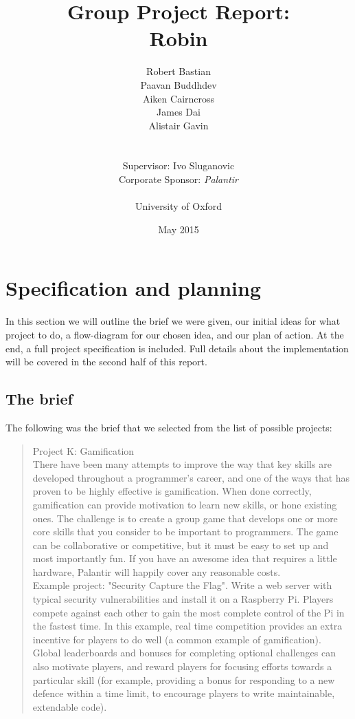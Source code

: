 \documentclass{report}
\title{Group Project Report:\\Robin}
\author{Robert Bastian\\Paavan Buddhdev\\Aiken Cairncross\\James Dai\\Alistair Gavin\\\\\\Supervisor: Ivo Sluganovic\\Corporate Sponsor: \emph{Palantir}\\\\University of Oxford}
\date{May 2015}
\begin{document}
\maketitle
\tableofcontents

\chapter{Specification and planning}
In this section we will outline the brief we were given, our initial ideas for what project to do, a flow-diagram for our chosen idea, and our plan of action. At the end, a full project specification is included. Full details about the implementation will be covered in the second half of this report.

\section{The brief}
The following was the brief that we selected from the list of possible projects:

\begin{quote}Project K: Gamification\\There have been many attempts to improve the way that key skills are developed throughout a programmer's career, and one of the ways that has proven to be highly effective is gamification. When done correctly, gamification can provide motivation to learn new skills, or hone existing ones. The challenge is to create a group game that develops one or more core skills that you consider to be important to programmers. The game can be collaborative or competitive, but it must be easy to set up and most importantly fun. If you have an awesome idea that requires a little hardware, Palantir will happily cover any reasonable costs.\\Example project: "Security Capture the Flag". Write a web server with typical security vulnerabilities and install it on a Raspberry Pi. Players compete against each other to gain the most complete control of the Pi in the fastest time. In this example, real time competition provides an extra incentive for players to do well (a common example of gamification). Global leaderboards and bonuses for completing optional challenges can also motivate players, and reward players for focusing efforts towards a particular skill (for example, providing a bonus for responding to a new defence within a time limit, to encourage players to write maintainable, extendable code).\end{quote}
\end{document}
